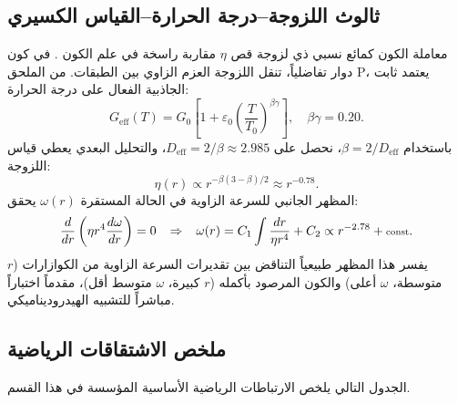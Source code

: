 \documentclass[12pt,a4paper]{article}
\begin{document}
	\subsection{ثالوث اللزوجة–درجة الحرارة–القياس الكسيري}
	
	معاملة الكون كمائع نسبي ذي لزوجة قص \(\eta\) مقاربة راسخة في علم الكون \cite{Giovannini2005}. في كون دوار تفاضلياً، تنقل اللزوجة العزم الزاوي بين الطبقات. من الملحق P، يعتمد ثابت الجاذبية الفعال على درجة الحرارة:
	\begin{equation}
		G_{\mathrm{eff}}(T) = G_0\left[1 + \varepsilon_0\left(\frac{T}{T_0}\right)^{\beta\gamma}\right], \quad \beta\gamma = 0.20.
	\end{equation}
	باستخدام \(\beta = 2/D_{\mathrm{eff}}\)، نحصل على \(D_{\mathrm{eff}} = 2/\beta \approx 2.985\)، والتحليل البعدي يعطي قياس اللزوجة:
	\begin{equation}
		\eta(r) \propto r^{-\beta(3-\beta)/2} \approx r^{-0.78}.
	\end{equation}
	المظهر الجانبي للسرعة الزاوية في الحالة المستقرة \(\omega(r)\) يحقق:
	\begin{equation}
		\scriptsize
		\frac{d}{dr}\left( \eta r^4 \frac{d\omega}{dr} \right) = 0 \quad \Rightarrow \quad \omega(r) = C_1 \int \frac{dr}{\eta r^4} + C_2 \propto r^{-2.78} + \text{const}.
	\end{equation}
	يفسر هذا المظهر طبيعياً التناقض بين تقديرات السرعة الزاوية من الكوازارات (\(r\) متوسطة، \(\omega\) أعلى) والكون المرصود بأكمله (\(r\) كبيرة، \(\omega\) متوسط أقل)، مقدماً اختباراً مباشراً للتشبيه الهيدروديناميكي.
	
	\subsection{ملخص الاشتقاقات الرياضية}
	
	الجدول التالي يلخص الارتباطات الرياضية الأساسية المؤسسة في هذا القسم.
	
\end{document}
